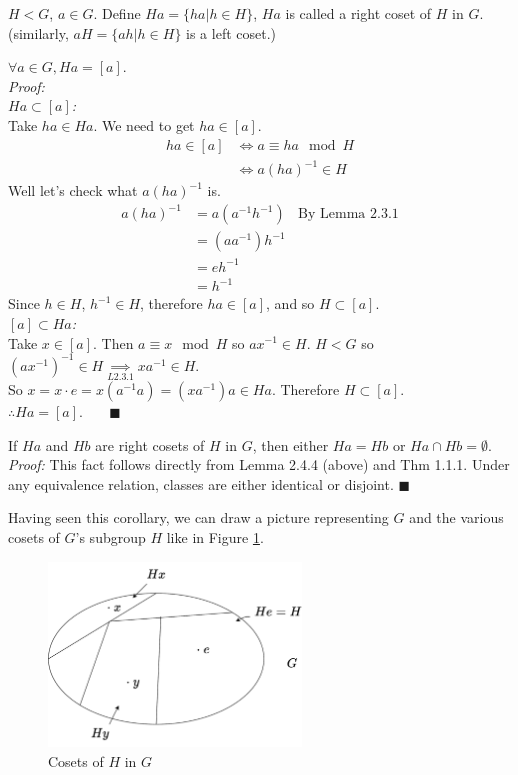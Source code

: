 \begin{definition}[Cosets]
$H<G$, $a\in G$. Define $Ha=\{ha|h\in H\}$, $Ha$ is called a right coset of $H$ in $G$.\\
(similarly, $aH=\{ah|h\in H\}$ is a left coset.)
\end{definition}
\begin{lemma}
$\forall a\in G, Ha=[a]$.\\
\textit{Proof:}\steezybreak\\
\textit{$Ha\subset [a]$:} \\ 
Take $ha\in Ha$. We need to get $ha\in [a]$.
\begin{align}
    ha\in[a] &\iff a\equiv ha \mod H \nonumber\\
    &\iff a (ha)^{-1} \in H \nonumber
\end{align}
Well let's check what $a(ha)^{-1}$ is.
\begin{align}
    a(ha)^{-1}&= a(a^{-1}h^{-1}) \ \ \ \ \text{By Lemma 2.3.1} \nonumber  \\
              &= (aa^{-1})h^{-1} \nonumber \\
              &= eh^{-1} \nonumber \\
              &= h^{-1} \nonumber 
\end{align}
Since $h\in H$, $h^{-1}\in H$, therefore $ha\in [a]$, and so $H\subset [a]$.\steezybreak\\
\textit{$[a]\subset Ha$:} \\
Take $x\in [a]$. Then $a\equiv x \mod H$ so $ax^{-1}\in H$. $H<G$ so $(ax^{-1})^{-1}\in H \underset{L 2.3.1}{\implies} xa^{-1}\in H$. \\
So $x=x\cdot e=x(a^{-1}a)=(xa^{-1})a\in Ha$. Therefore $H\subset [a]$.\\
$\therefore Ha=[a]$. $\ \ \ \ \ \ \ \blacksquare$
\end{lemma}
\setcounter{dummy_lemma}{3}
\begin{corollary}
If $Ha$ and $Hb$ are right cosets of $H$ in $G$, then either $Ha=Hb$ or $Ha\cap Hb=\emptyset$.\\
\textit{Proof:} This fact follows directly from Lemma 2.4.4 (above) and Thm 1.1.1. Under any equivalence relation, classes are either identical or disjoint. $\blacksquare$
\end{corollary}
Having seen this corollary, we can draw a picture representing $G$ and the various cosets of $G$'s subgroup $H$ like in Figure \ref{fig:cosets_fig}.
\begin{figure}[h!]
    \centering
    \includegraphics[width=0.6\textwidth]{Figures/Cosets_pic.pdf}
    \caption{Cosets of $H$ in $G$}
    \label{fig:cosets_fig}
\end{figure}
